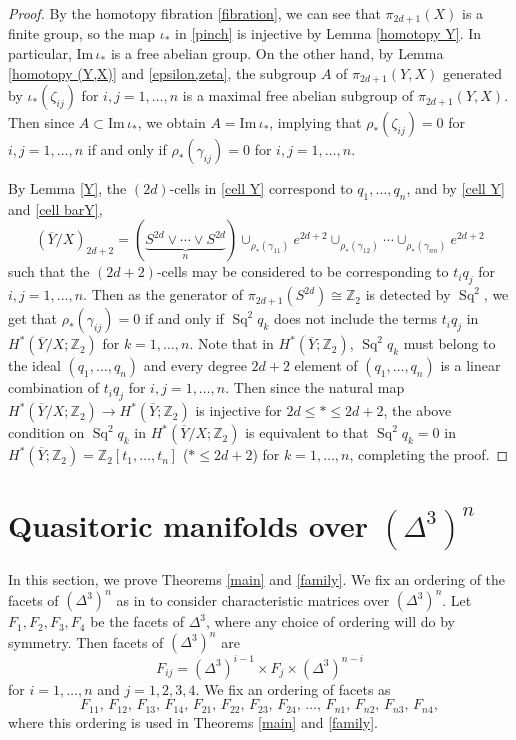 \documentclass[a4paper]{amsart}
\numberwithin{equation}{section}
\theoremstyle{definition}
\theoremstyle{remark}
\numberwithin{equation}{section}
\newcommand{\Z}{\mathbb{Z}}
\newcommand{\Sq}{\operatorname{Sq}}
\begin{document}
\begin{proof}
  By the homotopy fibration \eqref{fibration}, we can see that $\pi_{2d+1}(X)$ is a finite group, so the map $\iota_*$ in \eqref{pinch} is injective by Lemma \ref{homotopy Y}. In particular, $\mathrm{Im}\,\iota_*$ is a free abelian group. On the other hand, by Lemma \ref{homotopy (Y,X)} and \eqref{epsilon,zeta}, the subgroup $A$ of $\pi_{2d+1}(Y,X)$ generated by $\iota_*(\zeta_{ij})$ for $i,j=1,\ldots,n$ is a maximal free abelian subgroup of $\pi_{2d+1}(Y,X)$. Then since $A\subset\mathrm{Im}\,\iota_*$, we obtain $A=\mathrm{Im}\,\iota_*$, implying that $\rho_*(\zeta_{ij})=0$ for $i,j=1,\ldots,n$ if and only if $\rho_*(\gamma_{ij})=0$ for $i,j=1,\ldots,n$.



  By Lemma \ref{Y}, the $(2d)$-cells in \eqref{cell Y} correspond to $q_1,\ldots,q_n$, and by \eqref{cell Y} and \eqref{cell barY},
  \[
    (\overline{Y}/X)_{2d+2}=(\underbrace{S^{2d}\vee\cdots\vee S^{2d}}_n)\cup_{\rho_*(\gamma_{11})}e^{2d+2}\cup_{\rho_*(\gamma_{12})}\cdots\cup_{\rho_*(\gamma_{nn})}e^{2d+2}
  \]
  such that the $(2d+2)$-cells may be considered to be corresponding to $t_iq_j$ for $i,j=1,\ldots,n$. Then as the generator of $\pi_{2d+1}(S^{2d})\cong\Z_2$ is detected by $\Sq^2$, we get that $\rho_*(\gamma_{ij})=0$ if and only if $\Sq^2q_k$ does not include the terms $t_iq_j$ in $H^*(\overline{Y}/X;\Z_2)$ for $k=1,\ldots,n$. Note that in $H^*(\overline{Y};\Z_2)$, $\Sq^2q_k$ must belong to the ideal $(q_1,\ldots,q_n)$ and every degree $2d+2$ element of $(q_1,\ldots,q_n)$ is a linear combination of $t_iq_j$ for $i,j=1,\ldots,n$. Then since the natural map $H^*(\overline{Y}/X;\Z_2)\to H^*(\overline{Y};\Z_2)$ is injective for $2d\le *\le 2d+2$, the above condition on $\Sq^2q_k$ in $H^*(\overline{Y}/X;\Z_2)$ is equivalent to that $\Sq^2q_k=0$ in $H^*(\overline{Y};\Z_2)=\Z_2[t_1,\ldots,t_n]$ ($*\le 2d+2$) for $k=1,\ldots,n$, completing the proof.
\end{proof}




\section{Quasitoric manifolds over $(\Delta^3)^n$}\label{Quasitoric manifold}

In this section, we prove Theorems \ref{main} and \ref{family}. We fix an ordering of the facets of $(\Delta^3)^n$ as in \cite{CMS} to consider characteristic matrices over $(\Delta^3)^n$. Let $F_1,F_2,F_3,F_4$ be the facets of $\Delta^3$, where any choice of ordering will do by symmetry. Then facets of $(\Delta^3)^n$ are
\[
  F_{ij}=(\Delta^3)^{i-1}\times F_j\times(\Delta^3)^{n-i}
\]
for $i=1,\ldots,n$ and $j=1,2,3,4$. We fix an ordering of facets as
\[
  F_{11},\,F_{12},\,F_{13},\,F_{14},\,F_{21},\,F_{22},\,F_{23},\,F_{24},\,\ldots,\,F_{n1},\,F_{n2},\,F_{n3},\,F_{n4},
\]
where this ordering is used in Theorems \ref{main} and \ref{family}.
\end{document}
